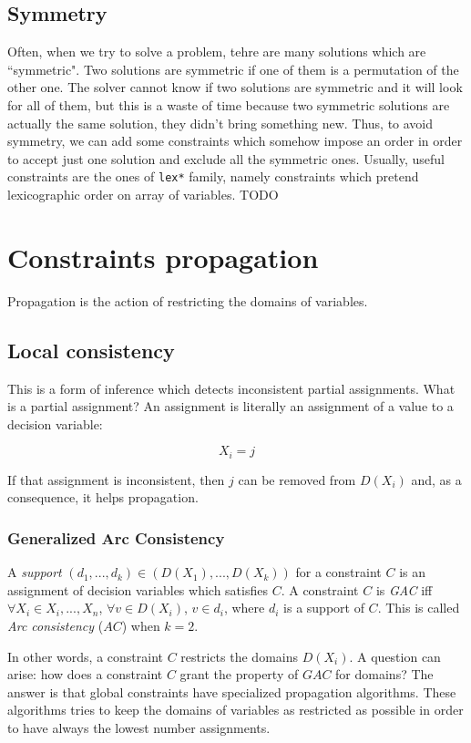 \documentclass[10pt,a4paper]{article}
\begin{document}
\subsection{Symmetry}
Often, when we try to solve a problem, tehre are many solutions which are
``symmetric". Two solutions are symmetric if one of them is a permutation of the
other one. The solver cannot know if two solutions are symmetric and it will
look for all of them, but this is a waste of time because two symmetric
solutions are actually the same solution, they didn't bring something new. Thus,
to avoid symmetry, we can add some constraints which somehow impose an order in
order to accept just one solution and exclude all the symmetric ones. Usually,
useful constraints are the ones of \texttt{lex*} family, namely constraints
which pretend lexicographic order on array of variables.
TODO

\section{Constraints propagation}
Propagation is the action of restricting the domains of variables.

\subsection{Local consistency}
This is a form of inference which detects inconsistent partial assignments. What
is a partial assignment? An assignment is literally an assignment of a value to
a decision variable:

\[ X_i = j \]

If that assignment is inconsistent, then $j$ can be removed from $D(X_i)$ and,
as a consequence, it helps propagation.

\subsubsection{Generalized Arc Consistency}
A \textit{support} $(d_1, ..., d_k) \in (D(X_1), ..., D(X_k))$  for a constraint
$C$ is an assignment of decision variables which satisfies $C$.
A constraint $C$ is \textit{GAC} iff $\forall X_i \in {X_i, ..., X_n}$,
$\forall v \in D(X_i)$, $v \in d_i$, where $d_i$ is a support of $C$.
This is called \textit{Arc consistency} ($AC$) when $k = 2$.

In other words, a constraint $C$ restricts the domains $D(X_i)$. A question can
arise: how does a constraint $C$ grant the property of $GAC$ for domains? The
answer is that global constraints have specialized propagation algorithms. These
algorithms tries to keep the domains of variables as restricted as possible in
order to have always the lowest number assignments.
\end{document}
